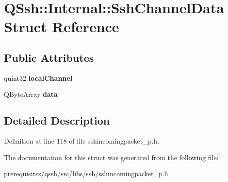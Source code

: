 \hypertarget{struct_q_ssh_1_1_internal_1_1_ssh_channel_data}{}\section{Q\+Ssh\+:\+:Internal\+:\+:Ssh\+Channel\+Data Struct Reference}
\label{struct_q_ssh_1_1_internal_1_1_ssh_channel_data}
\subsection*{Public Attributes}
\begin{DoxyCompactItemize}
\item 
\mbox{\label{struct_q_ssh_1_1_internal_1_1_ssh_channel_data_aa6b458555d61280fad1f80f5d0b22e64}} 
quint32 {\bfseries local\+Channel}
\item 
\mbox{\label{struct_q_ssh_1_1_internal_1_1_ssh_channel_data_ac36aed4af34e311a522c061cf638c751}} 
Q\+Byte\+Array {\bfseries data}
\end{DoxyCompactItemize}


\subsection{Detailed Description}


Definition at line 118 of file sshincomingpacket\+\_\+p.\+h.



The documentation for this struct was generated from the following file\+:\begin{DoxyCompactItemize}
\item 
prerequisites/qssh/src/libs/ssh/sshincomingpacket\+\_\+p.\+h\end{DoxyCompactItemize}
